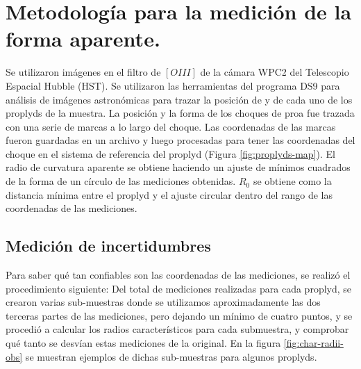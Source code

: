 \section{Metodología para la medición de la forma aparente.}
\label{sec:methodology}
Se utilizaron imágenes en el filtro de $[OIII]$ de la cámara WPC2 del Telescopio Espacial Hubble (HST). Se utilizaron las herramientas del programa DS9 para análisis de imágenes astronómicas para trazar la posición de \thC{} y de cada uno de los proplyds de la muestra. La posición y la forma de los choques de proa fue
trazada con una serie de marcas a lo largo del choque. Las coordenadas de las marcas fueron guardadas en un archivo y luego procesadas para tener las coordenadas del choque en el sistema de referencia del proplyd (Figura \ref{fig:proplyds-map}). El radio de curvatura aparente se obtiene haciendo un ajuste de mínimos cuadrados de la forma de un círculo de las mediciones obtenidas. $R_0$ se obtiene como la distancia mínima entre el proplyd y el ajuste circular dentro del rango de las coordenadas de las mediciones. 

\subsection{Medición de incertidumbres}

Para saber qué tan confiables son las coordenadas de las mediciones, se realizó el procedimiento siguiente: Del total de mediciones realizadas para cada proplyd, se crearon varias sub-muestras donde se utilizamos aproximadamente las dos terceras partes de las mediciones, pero dejando un mínimo de cuatro puntos, y se procedió a calcular los radios característicos para cada submuestra, y comprobar qué tanto se desvían estas mediciones de la original. En la figura \ref{fig:char-radii-obs} se muestran ejemplos de dichas sub-muestras para algunos proplyds.



